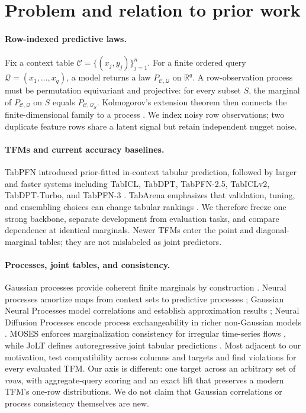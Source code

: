 \documentclass{article}
\newcommand{\context}{\mathcal{C}}
\newcommand{\query}{\mathcal{Q}}
\newcommand{\RR}{\mathbb{R}}
\begin{document}
\section{Problem and relation to prior work}

\paragraph{Row-indexed predictive laws.}
Fix a context table $\context=\{(x_j,y_j)\}_{j=1}^n$.  For a finite ordered
query $\query=(x_1,\ldots,x_q)$, a model returns a law
$P_{\context,\query}$ on $\RR^q$.  A row-observation process must be
permutation equivariant and projective: for every subset $S$, the marginal of
$P_{\context,\query}$ on $S$ equals
$P_{\context,\query_S}$.  Kolmogorov's extension theorem then connects the
finite-dimensional family to a process
\citep{kallenberg2002foundations}.  We index noisy row observations; two
duplicate feature rows share a latent signal but retain independent nugget
noise.

\paragraph{TFMs and current accuracy baselines.}
TabPFN introduced prior-fitted in-context tabular prediction, followed by
larger and faster systems including TabICL, TabDPT, TabPFN-2.5, TabICLv2,
TabDPT-Turbo, and TabPFN-3
\citep{qu2025tabicl,ma2025tabdpt,grinsztajn2025tabpfn25,
hosseinzadeh2026tabdptturbo,grinsztajn2026tabpfn3}.  TabArena emphasizes that
validation, tuning, and ensembling choices can change tabular rankings
\citep{erickson2025tabarena}.  We therefore freeze one strong backbone,
separate development from evaluation tasks, and compare dependence at
identical marginals.  Newer TFMs enter the point and diagonal-marginal tables;
they are not mislabeled as joint predictors.

\paragraph{Processes, joint tables, and consistency.}
Gaussian processes provide coherent finite marginals by construction
\citep{rasmussen2006gp}.  Neural processes amortize maps from context sets to
predictive processes \citep{garnelo2018cnp}; Gaussian Neural Processes model
correlations and establish approximation results
\citep{bruinsma2021gnp}; Neural Diffusion Processes encode process
exchangeability in richer non-Gaussian models \citep{dutordoir2023ndp}.
MOSES enforces marginalization consistency for irregular time-series flows
\citep{yalavarthi2026moses}, while JoLT defines autoregressive joint tabular
predictions \citep{shysheya2025jolt}.  Most adjacent to our motivation,
\citet{klotergens2026agree} test compatibility across columns and targets and
find violations for every evaluated TFM.  Our axis is different: one target
across an arbitrary set of \emph{rows}, with aggregate-query scoring and an
exact lift that preserves a modern TFM's one-row distributions.  We do not
claim that Gaussian correlations or process consistency themselves are new.
\end{document}
